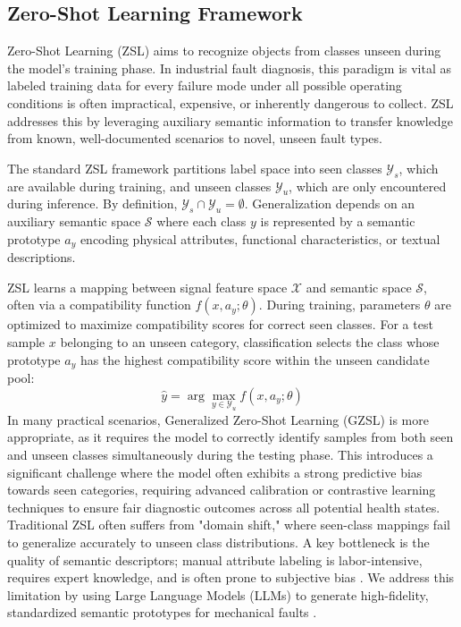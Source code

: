 \documentclass[journal]{IEEEtran}
\begin{document}
\subsection{Zero-Shot Learning Framework}
Zero-Shot Learning (ZSL) aims to recognize objects from classes unseen during the model's training phase. In industrial fault diagnosis, this paradigm is vital as labeled training data for every failure mode under all possible operating conditions is often impractical, expensive, or inherently dangerous to collect. ZSL addresses this by leveraging auxiliary semantic information to transfer knowledge from known, well-documented scenarios to novel, unseen fault types.

The standard ZSL framework partitions label space into seen classes $\mathcal{Y}_s$, which are available during training, and unseen classes $\mathcal{Y}_u$, which are only encountered during inference. By definition, $\mathcal{Y}_s \cap \mathcal{Y}_u = \emptyset$. Generalization depends on an auxiliary semantic space $\mathcal{S}$ where each class $y$ is represented by a semantic prototype $a_y$ encoding physical attributes, functional characteristics, or textual descriptions.

ZSL learns a mapping between signal feature space $\mathcal{X}$ and semantic space $\mathcal{S}$, often via a compatibility function $f(x, a_y; \theta)$. During training, parameters $\theta$ are optimized to maximize compatibility scores for correct seen classes. For a test sample $x$ belonging to an unseen category, classification selects the class whose prototype $a_y$ has the highest compatibility score within the unseen candidate pool:
\begin{equation}
\hat{y} = \arg\max_{y \in \mathcal{Y}_u} f(x, a_y; \theta)
\end{equation}
In many practical scenarios, Generalized Zero-Shot Learning (GZSL) is more appropriate, as it requires the model to correctly identify samples from both seen and unseen classes simultaneously during the testing phase. This introduces a significant challenge where the model often exhibits a strong predictive bias towards seen categories, requiring advanced calibration or contrastive learning techniques to ensure fair diagnostic outcomes across all potential health states. Traditional ZSL often suffers from "domain shift," where seen-class mappings fail to generalize accurately to unseen class distributions. A key bottleneck is the quality of semantic descriptors; manual attribute labeling is labor-intensive, requires expert knowledge, and is often prone to subjective bias \cite{palatucci2009zero, lampert2009learning}. We address this limitation by using Large Language Models (LLMs) to generate high-fidelity, standardized semantic prototypes for mechanical faults \cite{xian2018zero}.
\end{document}
